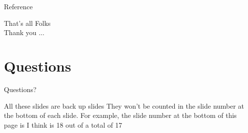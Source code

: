 \documentclass{beamer}
\begin{document}
\begin{frame}[allowframebreaks]{Reference}
    \nocite{lindblad1976g}
    \nocite{maday2003new}

   
\end{frame}
\begin{frame}
 \Huge 
 \centering 
  That's all Folks\\
  {\large Thank you ...}
\end{frame}
\section{Questions}
 \begin{frame}
 \begin{center}
   \huge Questions?
 \end{center}
 \end{frame} 
\appendix
\begin{frame}{All these slides are back up slides}
They won't be counted in the slide number at the bottom of each slide.
For example, the slide number at the bottom of this page is I think is 18 out of a total of 17
    
\end{frame}
\end{document}
